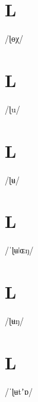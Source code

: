 \documentclass[10pt,a4paper,twoside]{book}
\begin{document}
\section*{L}

\begin{multicols}{3}
 {/ɭɵχ/} {}
\end{multicols}

\section*{L}

\begin{multicols}{3}
 {/ɭu/} {}
\end{multicols}

\section*{L}

\begin{multicols}{3}
 {/ɭʉ/} {}
\end{multicols}

\section*{L}

\begin{multicols}{3}
 {/ˈɭʉǀɶŋ/} {}
\end{multicols}

\section*{L}

\begin{multicols}{3}
 {/ɭʉŋ/} {}
\end{multicols}

\section*{L}

\begin{multicols}{3}
 {/ˈɭʉtʼɒ/} {}
\end{multicols}
\end{document}
